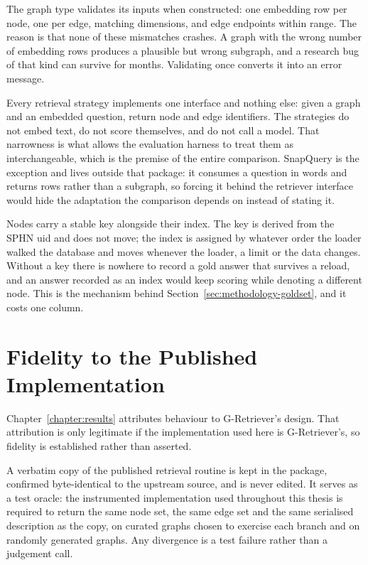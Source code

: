 The graph type validates its inputs when constructed: one embedding row per node,
one per edge, matching dimensions, and edge endpoints within range. The reason is
that none of these mismatches crashes. A graph with the wrong number of embedding
rows produces a plausible but wrong subgraph, and a research bug of that kind can
survive for months. Validating once converts it into an error message.

Every retrieval strategy implements one interface and nothing else: given a graph
and an embedded question, return node and edge identifiers. The strategies do
not embed text, do not score themselves, and do not call a model. That narrowness
is what allows the evaluation harness to treat them as interchangeable, which is
the premise of the entire comparison. SnapQuery is the exception and lives
outside that package: it consumes a question in words and returns rows rather
than a subgraph, so forcing it behind the retriever interface would hide the
adaptation the comparison depends on instead of stating it.

Nodes carry a stable key alongside their index. The key is derived from the SPHN
uid and does not move; the index is assigned by whatever order the loader walked
the database and moves whenever the loader, a limit or the data changes. Without
a key there is nowhere to record a gold answer that survives a reload, and an
answer recorded as an index would keep scoring while denoting a different node.
This is the mechanism behind Section~\ref{sec:methodology-goldset}, and it costs
one column.

\section{Fidelity to the Published Implementation} \label{sec:implementation-fidelity}

Chapter~\ref{chapter:results} attributes behaviour to G-Retriever's design. That
attribution is only legitimate if the implementation used here is G-Retriever's,
so fidelity is established rather than asserted.

A verbatim copy of the published retrieval routine is kept in the package,
confirmed byte-identical to the upstream source, and is never edited. It serves
as a test oracle: the instrumented implementation used throughout this thesis is
required to return the same node set, the same edge set and the same serialised
description as the copy, on curated graphs chosen to exercise each branch and on
randomly generated graphs. Any divergence is a test failure rather than a
judgement call.

